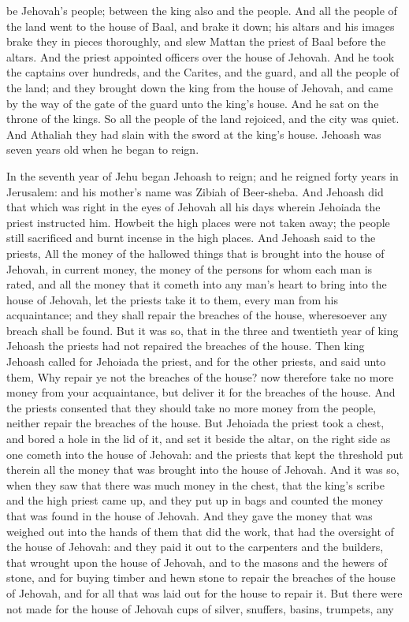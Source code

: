 be Jehovah’s people; between the king also and the people. And all the people of the land went to the house of Baal, and brake it down; his altars and his images brake they in pieces thoroughly, and slew Mattan the priest of Baal before the altars. And the priest appointed officers over the house of Jehovah. And he took the captains over hundreds, and the Carites, and the guard, and all the people of the land; and they brought down the king from the house of Jehovah, and came by the way of the gate of the guard unto the king’s house. And he sat on the throne of the kings. So all the people of the land rejoiced, and the city was quiet. And Athaliah they had slain with the sword at the king’s house.  Jehoash was seven years old when he began to reign. 

In the seventh year of Jehu began Jehoash to reign; and he reigned forty years in Jerusalem: and his mother’s name was Zibiah of Beer-sheba. And Jehoash did that which was right in the eyes of Jehovah all his days wherein Jehoiada the priest instructed him. Howbeit the high places were not taken away; the people still sacrificed and burnt incense in the high places.  And Jehoash said to the priests, All the money of the hallowed things that is brought into the house of Jehovah, in current money, the money of the persons for whom each man is rated, and all the money that it cometh into any man’s heart to bring into the house of Jehovah, let the priests take it to them, every man from his acquaintance; and they shall repair the breaches of the house, wheresoever any breach shall be found. But it was so, that in the three and twentieth year of king Jehoash the priests had not repaired the breaches of the house. Then king Jehoash called for Jehoiada the priest, and for the other priests, and said unto them, Why repair ye not the breaches of the house? now therefore take no more money from your acquaintance, but deliver it for the breaches of the house. And the priests consented that they should take no more money from the people, neither repair the breaches of the house.  But Jehoiada the priest took a chest, and bored a hole in the lid of it, and set it beside the altar, on the right side as one cometh into the house of Jehovah: and the priests that kept the threshold put therein all the money that was brought into the house of Jehovah. And it was so, when they saw that there was much money in the chest, that the king’s scribe and the high priest came up, and they put up in bags and counted the money that was found in the house of Jehovah. And they gave the money that was weighed out into the hands of them that did the work, that had the oversight of the house of Jehovah: and they paid it out to the carpenters and the builders, that wrought upon the house of Jehovah, and to the masons and the hewers of stone, and for buying timber and hewn stone to repair the breaches of the house of Jehovah, and for all that was laid out for the house to repair it. But there were not made for the house of Jehovah cups of silver, snuffers, basins, trumpets, any 
